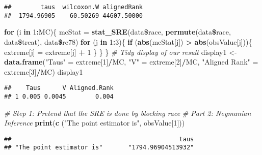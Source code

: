 \documentclass[]{article}
\newenvironment{Shaded}{\begin{snugshade}}{\end{snugshade}}
\newcommand{\KeywordTok}[1]{\textcolor[rgb]{0.13,0.29,0.53}{\textbf{#1}}}
\newcommand{\DecValTok}[1]{\textcolor[rgb]{0.00,0.00,0.81}{#1}}
\newcommand{\StringTok}[1]{\textcolor[rgb]{0.31,0.60,0.02}{#1}}
\newcommand{\CommentTok}[1]{\textcolor[rgb]{0.56,0.35,0.01}{\textit{#1}}}
\newcommand{\ControlFlowTok}[1]{\textcolor[rgb]{0.13,0.29,0.53}{\textbf{#1}}}
\newcommand{\OperatorTok}[1]{\textcolor[rgb]{0.81,0.36,0.00}{\textbf{#1}}}
\newcommand{\NormalTok}[1]{#1}
\begin{document}
\begin{verbatim}
##        taus  wilcoxon.W alignedRank 
##  1794.96905    60.50269 44607.50000
\end{verbatim}

\begin{Shaded}
\begin{Highlighting}[]
\ControlFlowTok{for}\NormalTok{ (i }\ControlFlowTok{in} \DecValTok{1}\OperatorTok{:}\NormalTok{MC)\{}
\NormalTok{  mcStat =}\StringTok{ }\KeywordTok{stat_SRE}\NormalTok{(data}\OperatorTok{\$}\NormalTok{race, }\KeywordTok{permute}\NormalTok{(data}\OperatorTok{\$}\NormalTok{race, data}\OperatorTok{\$}\NormalTok{treat), data}\OperatorTok{\$}\NormalTok{re78)}
  \ControlFlowTok{for}\NormalTok{ (j }\ControlFlowTok{in} \DecValTok{1}\OperatorTok{:}\DecValTok{3}\NormalTok{)\{}
    \ControlFlowTok{if}\NormalTok{ (}\KeywordTok{abs}\NormalTok{(mcStat[j]) }\OperatorTok{>}\StringTok{ }\KeywordTok{abs}\NormalTok{(obsValue[j]))\{}
\NormalTok{      extreme[j] =}\StringTok{ }\NormalTok{extreme[j] }\OperatorTok{+}\StringTok{ }\DecValTok{1}
\NormalTok{    \}}
\NormalTok{  \}}
\NormalTok{\}}
\CommentTok{# Tidy display of our result}
\NormalTok{display1 <-}\StringTok{ }\KeywordTok{data.frame}\NormalTok{(}\StringTok{"Taus"}\NormalTok{ =}\StringTok{ }\NormalTok{extreme[}\DecValTok{1}\NormalTok{]}\OperatorTok{/}\NormalTok{MC, }\StringTok{"V"}\NormalTok{ =}\StringTok{ }\NormalTok{extreme[}\DecValTok{2}\NormalTok{]}\OperatorTok{/}\NormalTok{MC, }\StringTok{"Aligned Rank"}\NormalTok{ =}\StringTok{ }\NormalTok{extreme[}\DecValTok{3}\NormalTok{]}\OperatorTok{/}\NormalTok{MC)}
\NormalTok{display1}
\end{Highlighting}
\end{Shaded}

\begin{verbatim}
##    Taus      V Aligned.Rank
## 1 0.005 0.0045        0.004
\end{verbatim}

\begin{Shaded}
\begin{Highlighting}[]
\CommentTok{# Step 1: Pretend that the SRE is done by blocking race}
\CommentTok{# Part 2: Neymanian Inference}
\KeywordTok{print}\NormalTok{(}\KeywordTok{c}\NormalTok{ (}\StringTok{"The point estimator is"}\NormalTok{, obsValue[}\DecValTok{1}\NormalTok{]))}
\end{Highlighting}
\end{Shaded}

\begin{verbatim}
##                                              taus 
## "The point estimator is"       "1794.96904513932"
\end{verbatim}
\end{document}
